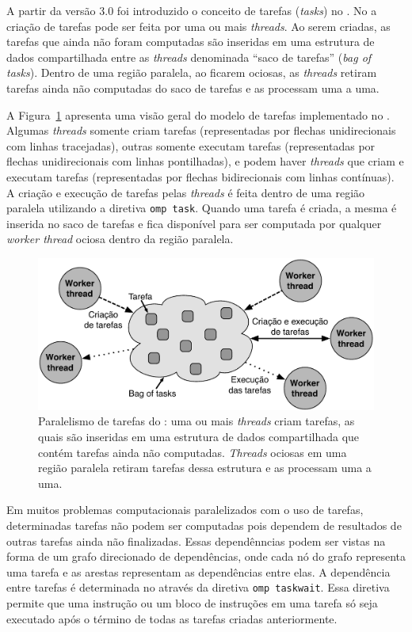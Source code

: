 \documentclass{SBCbookchapter}
\begin{document}
	A partir da versão 3.0 foi introduzido o conceito de tarefas (\textit{tasks}) no \openmp.
	No \openmp a criação de tarefas pode ser feita por uma ou mais \textit{threads}. Ao
	serem criadas, as tarefas que ainda não foram computadas são inseridas em uma
	estrutura de dados compartilhada entre as \textit{threads} denominada ``saco de tarefas''
	(\textit{bag of tasks}). Dentro de uma região paralela, ao ficarem ociosas, as \textit{threads}
	retiram tarefas ainda não computadas do saco de tarefas e as processam uma a uma.
	
	A Figura~\ref{fig:tasks} apresenta uma visão geral do modelo de
	tarefas implementado no \openmp. Algumas \textit{threads} somente
	criam tarefas (representadas por flechas unidirecionais com linhas
	tracejadas), outras somente executam tarefas (representadas por
	flechas unidirecionais com linhas pontilhadas), e podem haver
	\textit{threads} que criam e executam tarefas (representadas por
	flechas bidirecionais com linhas contínuas).  A criação e execução
	de tarefas pelas \textit{threads} é feita dentro de uma região
	paralela utilizando a diretiva \texttt{omp task}. Quando uma tarefa
	é criada, a mesma é inserida no saco de tarefas e fica disponível
	para ser computada por qualquer \textit{worker thread} ociosa dentro
	da região paralela.

		\begin{figure}[t]
			\centering
			\includegraphics[width=0.6\linewidth]{img/tasks}
			\caption{Paralelismo de tarefas do \openmp: uma ou mais \textit{threads} criam
			tarefas, as quais são inseridas em uma estrutura de dados compartilhada
			que contém tarefas ainda não computadas. \textit{Threads} ociosas em
			uma região paralela retiram tarefas dessa estrutura e as processam uma a
			uma.}
			\label{fig:tasks}
		\end{figure}


	Em muitos problemas computacionais paralelizados com o uso de
	tarefas, determinadas tarefas não podem ser computadas pois dependem
	de resultados de outras tarefas ainda não finalizadas. Essas
	dependênncias podem ser vistas na forma de um grafo direcionado de
	dependências, onde cada nó do grafo representa uma tarefa e as
	arestas representam as dependências entre elas. A dependência entre
	tarefas é determinada no \openmp através da diretiva \texttt{omp
	taskwait}. Essa diretiva permite que uma instrução ou um bloco de
	instruções em uma tarefa só seja executado após o término de todas
	as tarefas criadas anteriormente.
	
\end{document}
